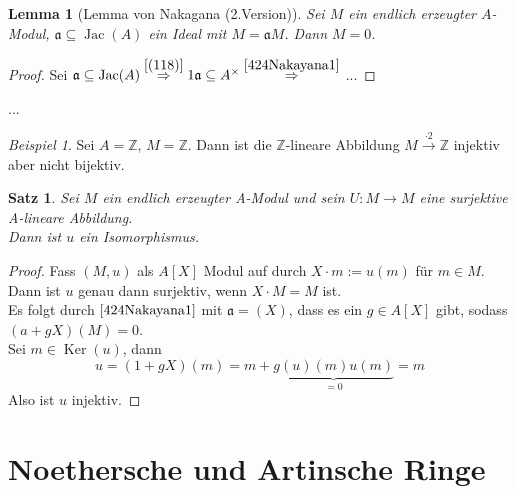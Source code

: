 \documentclass[10pt,a4paper]{article}
\newcommand{\Z}{\ensuremath{\mathbb{Z}}}
\newcommand{\Ker}{\ensuremath{\operatorname{Ker}}}
\newcommand{\Jac}{\ensuremath{\operatorname{Jac}}}
\newcounter{thm}[section]
\theoremstyle{definition}
\theoremstyle{plain}
\newtheorem{lem}[thm]{Lemma}
\newtheorem{satz}[thm]{Satz}
\theoremstyle{remark}
\newtheorem{exm}[thm]{Beispiel}
\begin{document}
\begin{lem}[Lemma von Nakagana (2.Version)]
	\label{425Nakagana2}
	Sei $M$ ein endlich erzeugter $A$-Modul, $\mathfrak a\subseteq\Jac(A)$ ein Ideal mit $M=\mathfrak aM$. Dann $M=0$.
\end{lem}
\begin{proof}
	Sei $\mathfrak a\subseteq \Jac(A)\overset{\ref{(118)}}\Rightarrow1\mathfrak a\subseteq A^\times\overset{\ref{424Nakayana1}}\Rightarrow$
		...%
\end{proof}
... %
\begin{exm}
	Sei $A=\Z$, $M=\Z$. Dann ist die $\Z$-lineare Abbildung $M\xrightarrow{\cdot 2}\Z$ injektiv aber nicht bijektiv.
\end{exm}
\begin{satz}
	\label{427}Sei $M$ ein endlich erzeugter A-Modul und sein $U:M\rightarrow M$ eine surjektive A-lineare Abbildung.\\
	Dann ist $u$ ein Isomorphismus.
\end{satz}
\begin{proof}
	Fass $(M,u)$ als $A[X]$ Modul auf durch $X\cdot m:=u(m)$ für $m\in M$.\\
	Dann ist $u$ genau dann surjektiv, wenn $X\cdot M=M$ ist.\\
	Es folgt durch $\ref{424Nakayana1}$ mit $\mathfrak a=(X)$, dass es ein $g\in A[X]$ gibt, sodass $(a+gX)(M)=0$.\\
	Sei $m\in\Ker(u)$, dann
	\[u=(1+gX)(m)=m+\underbrace{g(u)(m)u(m)}_{=0}=m\]
	Also ist $u$ injektiv.
\end{proof}
\section{Noethersche und Artinsche Ringe}
\end{document}
